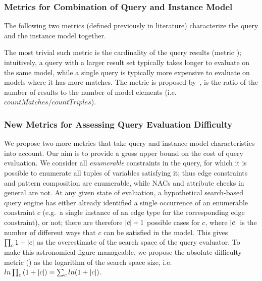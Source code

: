 \subsubsection{Metrics for Combination of Query and Instance Model}
The following two metrics (defined previously in literature) characterize the
query and the instance model together.

The most trivial such metric is the cardinality of the query results (metric
); intuitively, a query with a larger result set typically
takes longer to evaluate on the same model, while a single query is typically
more expensive to evaluate on models where it has more matches. The metric
 is proposed by~\cite{SPLODGE}, is the ratio of the
number of results to the number of model elements (i.e.\ 
$countMatches/countTriples$).


\subsubsection{New Metrics for Assessing Query Evaluation Difficulty}
We propose two more metrics that take query and instance model characteristics into account. 
Our aim is to provide a gross upper bound on
the cost of query evaluation. We consider all \emph{enumerable} constraints in
the query, for which it is possible to enumerate all tuples of variables
satisfying it; thus edge constraints and pattern composition are enumerable,
while NACs and attribute checks in general are not. At any given state of
evaluation, a hypothetical search-based query engine has either already
identified a single occurrence of an enumerable constraint $c$ (e.g.\ a single
instance of an edge type for the corresponding edge constraint), or not; there
are therefore $|{c}|+1$ possible cases for $c$, where $|{c}|$ is the number
of different ways that $c$ can be satisfied in the model. This gives
$\prod_{c}{1+|{c}|}$ as the overestimate of the search space of the query
evaluator. To make this astronomical figure manageable, we propose the absolute
difficulty metric (\code{absDifficulty}) as the logarithm of the search space
size, i.e.\ $ln\prod_{c}{(1+|{c}|)} = \sum_{c}{ln(1+|{c}|)}$.
 
